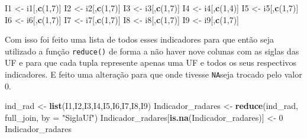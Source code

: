 \documentclass[
]{book}
\newenvironment{Shaded}{\begin{snugshade}}{\end{snugshade}}
\newcommand{\AttributeTok}[1]{\textcolor[rgb]{0.13,0.29,0.53}{#1}}
\newcommand{\DecValTok}[1]{\textcolor[rgb]{0.00,0.00,0.81}{#1}}
\newcommand{\FunctionTok}[1]{\textcolor[rgb]{0.13,0.29,0.53}{\textbf{#1}}}
\newcommand{\NormalTok}[1]{#1}
\newcommand{\OtherTok}[1]{\textcolor[rgb]{0.56,0.35,0.01}{#1}}
\newcommand{\StringTok}[1]{\textcolor[rgb]{0.31,0.60,0.02}{#1}}
\begin{document}
\begin{Shaded}
\begin{Highlighting}[]
\NormalTok{I1 }\OtherTok{\textless{}{-}}\NormalTok{ i1[,}\FunctionTok{c}\NormalTok{(}\DecValTok{1}\NormalTok{,}\DecValTok{7}\NormalTok{)]}
\NormalTok{I2 }\OtherTok{\textless{}{-}}\NormalTok{ i2[,}\FunctionTok{c}\NormalTok{(}\DecValTok{1}\NormalTok{,}\DecValTok{7}\NormalTok{)]}
\NormalTok{I3 }\OtherTok{\textless{}{-}}\NormalTok{ i3[,}\FunctionTok{c}\NormalTok{(}\DecValTok{1}\NormalTok{,}\DecValTok{7}\NormalTok{)]}
\NormalTok{I4 }\OtherTok{\textless{}{-}}\NormalTok{ i4[,}\FunctionTok{c}\NormalTok{(}\DecValTok{1}\NormalTok{,}\DecValTok{4}\NormalTok{)]}
\NormalTok{I5 }\OtherTok{\textless{}{-}}\NormalTok{ i5[,}\FunctionTok{c}\NormalTok{(}\DecValTok{1}\NormalTok{,}\DecValTok{7}\NormalTok{)]}
\NormalTok{I6 }\OtherTok{\textless{}{-}}\NormalTok{ i6[,}\FunctionTok{c}\NormalTok{(}\DecValTok{1}\NormalTok{,}\DecValTok{7}\NormalTok{)]}
\NormalTok{I7 }\OtherTok{\textless{}{-}}\NormalTok{ i7[,}\FunctionTok{c}\NormalTok{(}\DecValTok{1}\NormalTok{,}\DecValTok{7}\NormalTok{)]}
\NormalTok{I8 }\OtherTok{\textless{}{-}}\NormalTok{ i8[,}\FunctionTok{c}\NormalTok{(}\DecValTok{1}\NormalTok{,}\DecValTok{7}\NormalTok{)]}
\NormalTok{I9 }\OtherTok{\textless{}{-}}\NormalTok{ i9[,}\FunctionTok{c}\NormalTok{(}\DecValTok{1}\NormalTok{,}\DecValTok{7}\NormalTok{)]}
\end{Highlighting}
\end{Shaded}

Com isso foi feito uma lista de todos esses indicadores para que então seja utilizado a função \texttt{reduce()} de forma a não haver nove colunas com as siglas das UF e para que cada tupla represente apenas uma UF e todos os seus respectivos indicadores. E feito uma alteração para que onde tivesse \texttt{NA}seja trocado pelo valor 0.

\begin{Shaded}
\begin{Highlighting}[]
\NormalTok{ind\_rad }\OtherTok{\textless{}{-}} \FunctionTok{list}\NormalTok{(I1,I2,I3,I4,I5,I6,I7,I8,I9)}
\NormalTok{Indicador\_radares }\OtherTok{\textless{}{-}} \FunctionTok{reduce}\NormalTok{(ind\_rad, full\_join, }\AttributeTok{by =} \StringTok{"SiglaUf"}\NormalTok{)}
\NormalTok{Indicador\_radares[}\FunctionTok{is.na}\NormalTok{(Indicador\_radares)] }\OtherTok{\textless{}{-}} \DecValTok{0}
\NormalTok{Indicador\_radares}
\end{Highlighting}
\end{Shaded}
\end{document}

